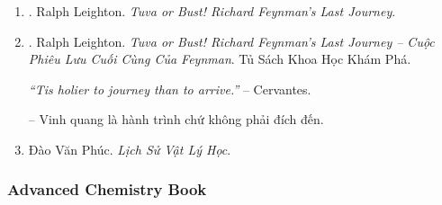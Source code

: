 \documentclass{article}
\begin{document}
\begin{enumerate}
	\item \cite{Leighton_Feyman_last_journey}. {\sc Ralph Leighton}. {\it Tuva or Bust! Richard Feynman's Last Journey}.
	
	\item \cite{Leighton_Feyman_last_journey_VN}. {\sc Ralph Leighton}. {\it Tuva or Bust! Richard Feynman's Last Journey -- Cuộc Phiêu Lưu Cuối Cùng Của Feynman}. Tủ Sách Khoa Học Khám Phá.\hfill{\sf[done]}
	
	{\it``Tis holier to journey than to arrive.''} -- {\sc Cervantes.}
	
	-- Vinh quang là hành trình chứ không phải đích đến. \cite[Suy ngẫm 2000, p. 269]{Leighton_Feyman_last_journey_VN}
	\item Đào Văn Phúc. {\it Lịch Sử Vật Lý Học}.
\end{enumerate}


\subsubsection{Advanced Chemistry Book}
\end{document}
